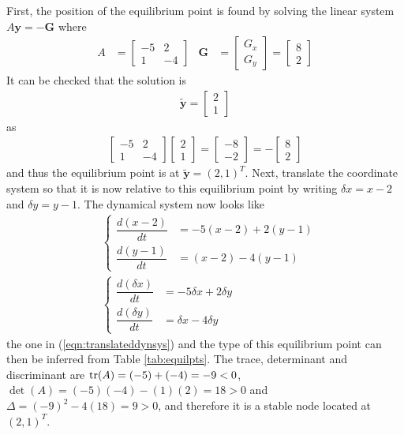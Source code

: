 \begin{solution}
First, the position of the equilibrium point is found by solving the linear system
$A\textbf{y} = -\textbf{G}$ where
\begin{align*}
A &= 
\begin{bmatrix}
-5 & 2 \\
1 & -4
\end{bmatrix}
&
\textbf{G} &= 
\begin{bmatrix}
G_x \\
G_y
\end{bmatrix}
=
\begin{bmatrix}
8 \\
2
\end{bmatrix}
\end{align*}
It can be checked that the solution is
\begin{align*}
\tilde{\textbf{y}} = \begin{bmatrix}
2 \\
1
\end{bmatrix}
\end{align*}
as
\begin{align*}
\begin{bmatrix}
-5 & 2 \\
1 & -4
\end{bmatrix}
\begin{bmatrix}
2 \\
1
\end{bmatrix}
=
\begin{bmatrix}
-8 \\
-2
\end{bmatrix}
=
-\begin{bmatrix}
8 \\
2
\end{bmatrix}
\end{align*}
and thus the equilibrium point is at $\tilde{\textbf{y}} = (2,1)^T$. Next, translate the coordinate system so that it is now relative to this equilibrium point by writing $\delta x = x - 2$ and $\delta y = y - 1$. The dynamical system now looks like
\begin{align*}
&\begin{cases}
\dfrac{d(x-2)}{dt} &= -5(x-2) + 2(y-1) \\[10pt]
\dfrac{d(y-1)}{dt} &= (x-2) - 4(y-1)
\end{cases} \\
&\begin{cases}
\dfrac{d(\delta x)}{dt} &= -5\delta x + 2\delta y \\[10pt]
\dfrac{d(\delta y)}{dt} &= \delta x - 4\delta y
\end{cases}
\end{align*}
the one in (\ref{eqn:translateddynsys}) and the type of this equilibrium point can then be inferred from Table \ref{tab:equilpts}. The trace, determinant and discriminant are $\tr(A) = (-5) + (-4) = -9 < 0$, $\det(A) = (-5)(-4) - (1)(2) = 18 > 0$ and $\Delta = (-9)^2 - 4(18) = 9 > 0$, and therefore it is a stable node located at $(2,1)^T$.
\end{solution}

